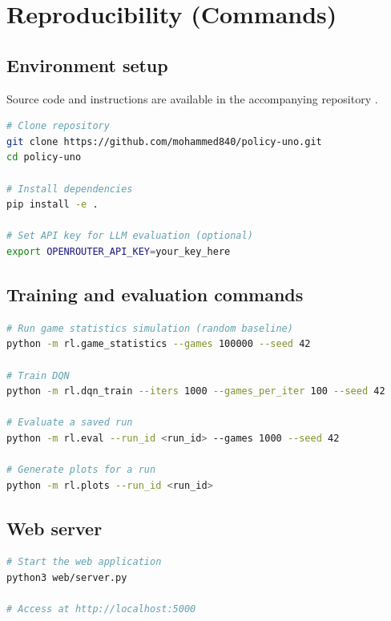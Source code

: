 \documentclass[11pt]{article}
\begin{document}
\FloatBarrier
\clearpage
{}
\nocite{final79_2}
\printbibliography[heading=bibintoc,title={References}]
\clearpage

\appendix
\section{Reproducibility (Commands)}
\subsection{Environment setup}
Source code and instructions are available in the accompanying repository \parencite{policyuno_repo}.
\begin{lstlisting}[language=bash]
# Clone repository
git clone https://github.com/mohammed840/policy-uno.git
cd policy-uno

# Install dependencies
pip install -e .

# Set API key for LLM evaluation (optional)
export OPENROUTER_API_KEY=your_key_here
\end{lstlisting}

\subsection{Training and evaluation commands}
\begin{lstlisting}[language=bash]
# Run game statistics simulation (random baseline)
python -m rl.game_statistics --games 100000 --seed 42

# Train DQN
python -m rl.dqn_train --iters 1000 --games_per_iter 100 --seed 42

# Evaluate a saved run
python -m rl.eval --run_id <run_id> --games 1000 --seed 42

# Generate plots for a run
python -m rl.plots --run_id <run_id>
\end{lstlisting}

\subsection{Web server}
\begin{lstlisting}[language=bash]
# Start the web application
python3 web/server.py

# Access at http://localhost:5000
\end{lstlisting}
\end{document}
